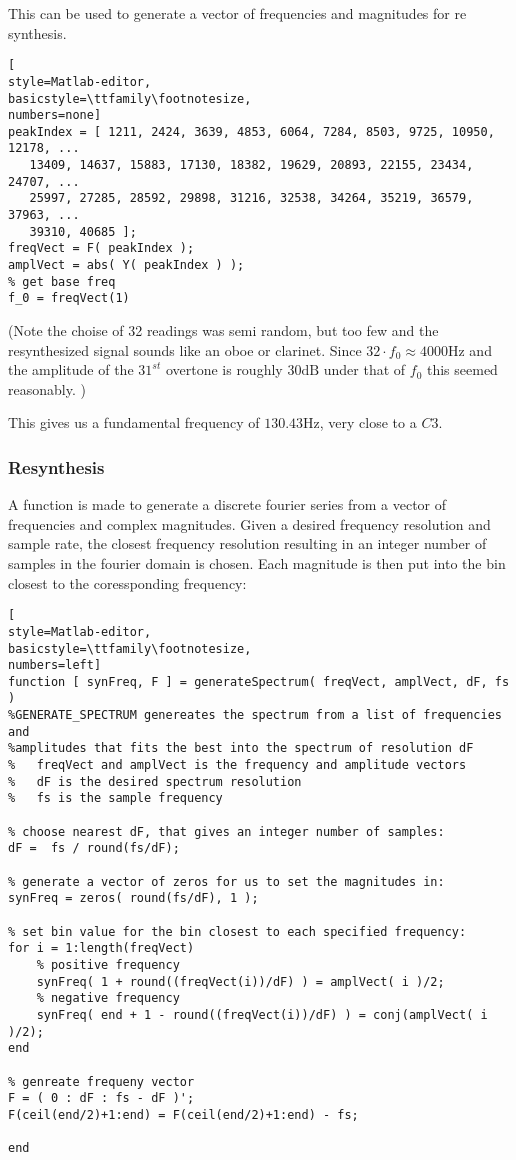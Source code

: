 This can be used to generate a vector of frequencies and magnitudes for re
synthesis.

\begin{lstlisting}[
style=Matlab-editor,
basicstyle=\ttfamily\footnotesize,
numbers=none]
peakIndex = [ 1211, 2424, 3639, 4853, 6064, 7284, 8503, 9725, 10950, 12178, ...
   13409, 14637, 15883, 17130, 18382, 19629, 20893, 22155, 23434, 24707, ...
   25997, 27285, 28592, 29898, 31216, 32538, 34264, 35219, 36579, 37963, ...
   39310, 40685 ]; 
freqVect = F( peakIndex );
amplVect = abs( Y( peakIndex ) );
% get base freq
f_0 = freqVect(1)
\end{lstlisting}
(Note the choise of 32 readings was semi random, but too few and the
resynthesized signal sounds like an oboe or clarinet. Since $32\cdot f_0
\approx 4000\mbox{Hz}$ and the amplitude of the $31^{st}$ overtone is roughly
$30\mbox{dB}$ under that of $f_0$ this seemed reasonably. )

This gives us a fundamental frequency of $130.43\mbox{Hz}$, very close to a
$C3$.

\subsubsection{ Resynthesis }
A function is made to generate a discrete fourier series from a vector of
frequencies and complex magnitudes. Given a desired frequency resolution and
sample rate, the closest frequency resolution resulting in an integer number of
samples in the fourier domain is chosen. Each magnitude is then put into the bin
closest to the coressponding frequency:
\begin{lstlisting}[
style=Matlab-editor,
basicstyle=\ttfamily\footnotesize,
numbers=left]
function [ synFreq, F ] = generateSpectrum( freqVect, amplVect, dF, fs )
%GENERATE_SPECTRUM genereates the spectrum from a list of frequencies and
%amplitudes that fits the best into the spectrum of resolution dF
%   freqVect and amplVect is the frequency and amplitude vectors
%   dF is the desired spectrum resolution
%   fs is the sample frequency

% choose nearest dF, that gives an integer number of samples:
dF =  fs / round(fs/dF);

% generate a vector of zeros for us to set the magnitudes in:
synFreq = zeros( round(fs/dF), 1 );

% set bin value for the bin closest to each specified frequency:
for i = 1:length(freqVect)
    % positive frequency
    synFreq( 1 + round((freqVect(i))/dF) ) = amplVect( i )/2;
    % negative frequency
    synFreq( end + 1 - round((freqVect(i))/dF) ) = conj(amplVect( i )/2);
end

% genreate frequeny vector
F = ( 0 : dF : fs - dF )';
F(ceil(end/2)+1:end) = F(ceil(end/2)+1:end) - fs;

end
\end{lstlisting}

